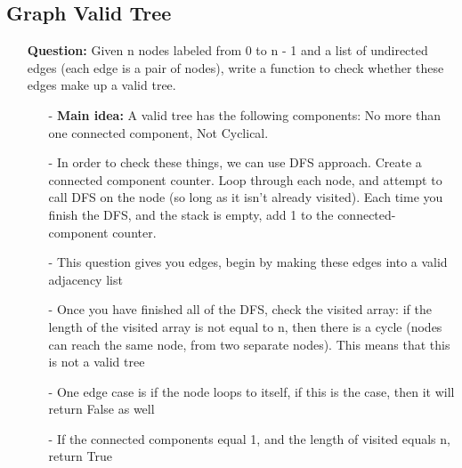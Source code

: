\documentclass[12pt]{article}
\begin{document}
\subsection{Graph Valid Tree}
\begin{enumerate}
  \item[] \textbf{Question:} Given n nodes labeled from 0 to n - 1 and a list of undirected edges (each edge is a pair of nodes), write a function to check whether these edges make up a valid tree.

    \begin{enumerate}
      \item[-] \textbf{Main idea:} A valid tree has the following components: No more than one connected component, Not Cyclical.
      \item[-] In order to check these things, we can use DFS approach. Create a connected component counter. Loop through each node, and attempt to call DFS on the node (so long as it isn't already visited). Each time you finish the DFS, and the stack is empty, add 1 to the connected-component counter.
      \item[-] This question gives you edges, begin by making these edges into a valid adjacency list
      \item[-] Once you have finished all of the DFS, check the visited array: if the length of the visited array is not equal to n, then there is a cycle (nodes can reach the same node, from two separate nodes). This means that this is not a valid tree
      \item[-] One edge case is if the node loops to itself, if this is the case, then it will return False as well 
      \item[-] If the connected components equal 1, and the length of visited equals n, return True
    \end{enumerate}
\end{enumerate}
\end{document}

